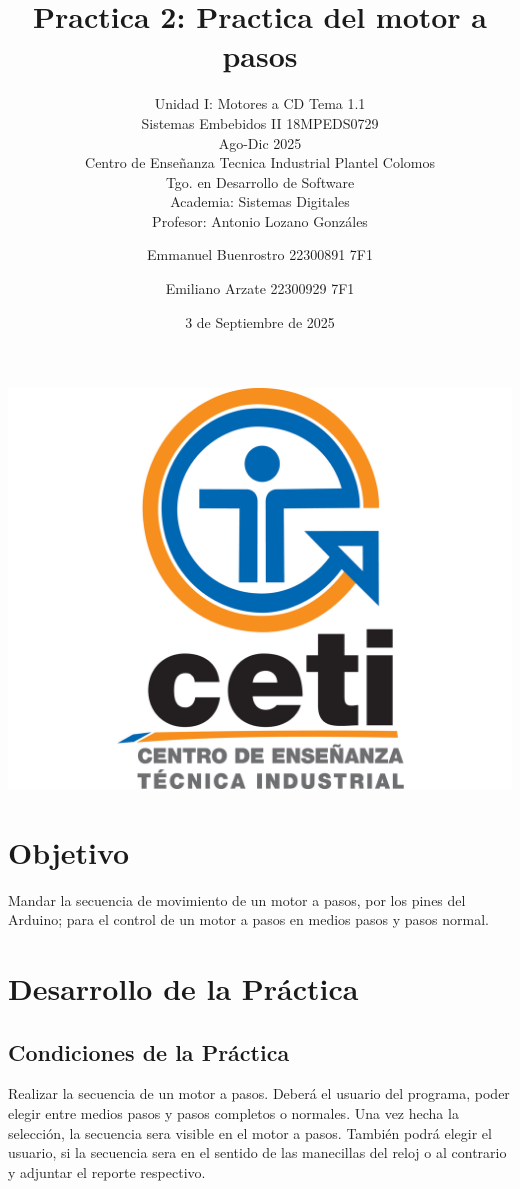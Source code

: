 \documentclass[11pt]{scrartcl}
\title {Practica 2: Practica del motor a pasos}
\subtitle{Unidad I: Motores a CD Tema 1.1 \\ Sistemas Embebidos II 18MPEDS0729 \\ Ago-Dic 2025 \\ Centro de Enseñanza Tecnica Industrial Plantel Colomos\\Tgo. en Desarrollo de Software \\ Academia: Sistemas Digitales \\Profesor: Antonio Lozano Gonzáles }
\date{3 de Septiembre de 2025}
\author{Emmanuel Buenrostro 22300891 7F1 \\ \and Emiliano Arzate 22300929 7F1 \\}
\begin{document}
\maketitle
\begin{center}
   \includegraphics[scale=0.15]{../../cetilogo.jpg} 
\end{center}
\newpage

\section{Objetivo}

Mandar la secuencia de movimiento de un motor a pasos, por los pines
del Arduino; para el control de un motor a pasos en medios pasos y pasos
normal.

\section{Desarrollo de la Práctica}

\subsection{Condiciones de la Práctica}

Realizar la secuencia de un motor a pasos. Deberá el usuario del
programa, poder elegir entre medios pasos y pasos completos o normales.
Una vez hecha la selección, la secuencia sera visible en el motor a
pasos. También podrá elegir el usuario, si la secuencia sera en el
sentido de las manecillas del reloj o al contrario y adjuntar el reporte
respectivo.
\end{document}
